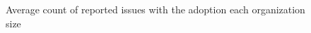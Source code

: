 \begin{figure}[!htb]
    \begin{center}
        \caption{Average count of reported issues with the adoption each organization size}\label{fig:Averagecountofreportedissueswiththeadoptioneachorganizationsize}
    \end{center}
\end{figure}

